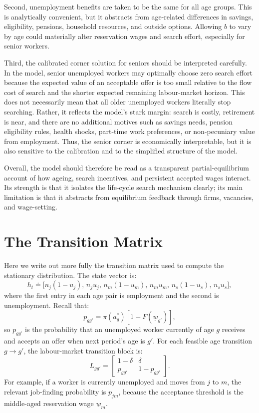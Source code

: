 \documentclass{article}
\begin{document}
Second, unemployment benefits are taken to be the same for all age groups. This is analytically convenient, but it abstracts from age-related differences in savings, eligibility, pensions, household resources, and outside options. Allowing $b$ to vary by age could materially alter reservation wages and search effort, especially for senior workers.

Third, the calibrated corner solution for seniors should be interpreted carefully. In the model, senior unemployed workers may optimally choose zero search effort because the expected value of an acceptable offer is too small relative to the flow cost of search and the shorter expected remaining labour-market horizon. This does not necessarily mean that all older unemployed workers literally stop searching. Rather, it reflects the model's stark margin: search is costly, retirement is near, and there are no additional motives such as savings needs, pension eligibility rules, health shocks, part-time work preferences, or non-pecuniary value from employment. Thus, the senior corner is economically interpretable, but it is also sensitive to the calibration and to the simplified structure of the model.

Overall, the model should therefore be read as a transparent partial-equilibrium account of how ageing, search incentives, and persistent accepted wages interact. Its strength is that it isolates the life-cycle search mechanism clearly; its main limitation is that it abstracts from equilibrium feedback through firms, vacancies, and wage-setting.


\appendix
\section{The Transition Matrix}

Here we write out more fully the transition matrix used to compute the stationary distribution. The state vector is:
\[
h_t
\doteq
\bigl[
n_j(1-u_j),\, n_j u_j,\,
n_m(1-u_m),\, n_m u_m,\,
n_s(1-u_s),\, n_s u_s
\bigr],
\]
where the first entry in each age pair is employment and the second is unemployment. Recall that:
\[
p_{gg'}=\pi(a_g^*)\left[1-F(\underline w_{g'})\right],
\]
so $p_{gg'}$ is the probability that an unemployed worker currently of age $g$ receives and accepts an offer when next period's age is $g'$. For each feasible age transition $g\to g'$, the labour-market transition block is:
\[
L_{gg'}
=
\begin{bmatrix}
1-\delta & \delta\\
p_{gg'} & 1-p_{gg'}
\end{bmatrix}.
\]
For example, if a worker is currently unemployed and moves from $j$ to $m$, the relevant job-finding probability is $p_{jm}$, because the acceptance threshold is the middle-aged reservation wage $\underline w_m$.
\end{document}
